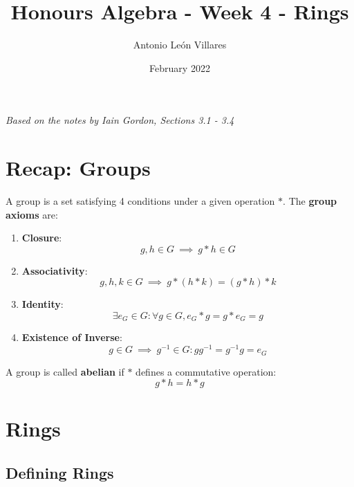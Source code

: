 \documentclass{exam}
\title{Honours Algebra - Week 4 - Rings}
\author{Antonio León Villares}
\date{February 2022}
\begin{document}
\maketitle

\tableofcontents

\pagebreak

\textit{Based on the notes by Iain Gordon, Sections 3.1 - 3.4}

\section{Recap: Groups}

A group is a set satisfying 4 conditions under a given operation $\ast$. The \textbf{group axioms} are:
\begin{enumerate}
    \item \textbf{Closure}:
    \[
    g,h \in G \ \implies \ g \ast h \in G
    \]
    \item \textbf{Associativity}:
    \[
    g,h,k \in G \ \implies \ g \ast (h \ast k) = (g \ast h) \ast k
    \]
    \item \textbf{Identity}:
    \[
    \exists e_G \in G : \forall g \in G, e_G \ast g = g \ast e_G = g 
    \]
    \item \textbf{Existence of Inverse}:
    \[
    g \in G \ \implies \ g^{-1} \in G : gg^{-1} = g^{-1}g = e_G
    \]
\end{enumerate}

A group is called \textbf{abelian} if $\ast$ defines a commutative operation:
\[
g \ast h = h \ast g
\]

\section{Rings}

\subsection{Defining Rings}
\end{document}
